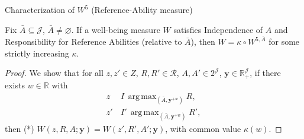 \documentclass[10pt]{beamer}
\DeclareMathOperator*{\argmax}{arg\,max}
\begin{document}
\begin{frame}[allowframebreaks]{Characterization of $W^5$ (Reference-Ability measure)}
\begin{theorem}
Fix $\bar A\subseteq\mathcal J$, $\bar A\neq\varnothing$.
If a well-being measure
$W$ satisfies Independence of $A$ and Responsibility for Reference Abilities
(relative to $\bar A$), then $W=\kappa\circ W^{5,\bar A}$ for some strictly increasing
$\kappa$.
\end{theorem}
\framebreak
\begin{proof}
We show that for all $z,z'\in Z$, $R,R'\in\mathcal R$, $A,A'\in 2^{\mathcal J}$,
$\mathbf y\in\mathbb R_+^{\mathcal J}$, if there exists $w\in\mathbb R$ with
\begin{align*}
z\,&I\,\argmax_{(\bar A,\mathbf y^{+w})}R,\\
z'\,&I'\,\argmax_{(\bar A,\mathbf y^{+w})}R',\end{align*}
then (*) $W(z,R,A;\mathbf y)=W(z',R',A';\mathbf y)$, with common value
$\kappa(w)$.


\end{proof}
\end{frame}
\end{document}
